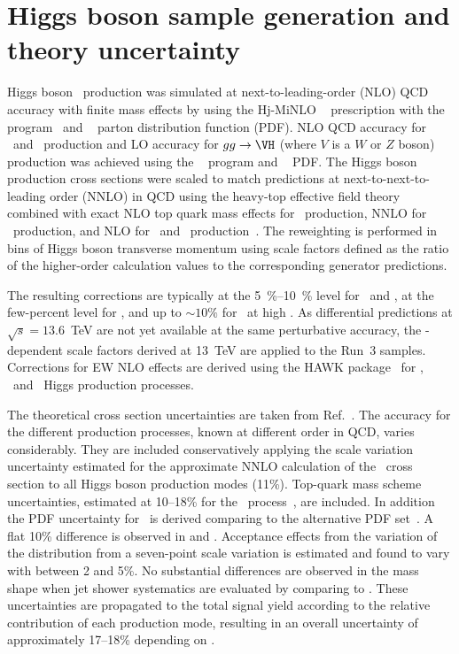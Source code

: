 \documentclass[PAPER, cernpreprint=true, atlasdraft=false, UKenglish, texmf, orcidlogo]{atlasdoc}
\begin{document}
\section{Higgs boson sample generation and theory uncertainty}
Higgs boson \ggF\ production was simulated at next-to-leading-order (NLO) QCD accuracy with finite mass effects by using the {\textsc Hj-MiNLO} ~\cite{Hamilton:2015nsa,Hamilton:2012np,Campbell:2012am,Hamilton:2012rf} prescription with the \POWHEGBOX program~\cite{Alioli:2010xd,Nason:2004rx,Frixione:2007vw} and \NNPDF[3.0nnlo]~\cite{Ball:2014uwa} parton distribution function (PDF).
NLO QCD accuracy for \VBF\ and \ttH\ production and LO accuracy for $gg\to\VH$ (where $V$ is a $W$ or $Z$ boson) production was achieved using the \POWHEGBOX~\cite{Nason:2009ai,Hartanto:2015uka,Alioli:2010xd,Nason:2004rx,Frixione:2007vw} program and \NNPDF[3.0nlo]~\cite{Ball:2014uwa} PDF.
The Higgs boson production cross sections were scaled to match predictions at next-to-next-to-leading order (NNLO) in QCD using the heavy-top effective field theory combined with exact NLO top quark mass effects for \ggF\ production, NNLO for \VBF\ production, and NLO for \VH\ and \ttH\ production~\cite{Becker:2020rjp}.
The reweighting is performed in bins of Higgs boson transverse momentum using scale factors defined as the ratio of the higher-order calculation values to the corresponding generator predictions.

The resulting corrections are typically at the \SIrange{5}{10}{\%} level for \ggF\ and \VBF, at the few-percent level for \ttH, and up to $\sim10\%$ for \VH\ at high \pT.
As differential predictions at $\sqrt{s}=13.6$~TeV are not yet available at the same perturbative accuracy, the \pT-dependent scale factors derived at 13~TeV are applied to the Run~3 samples.
Corrections for EW NLO effects are derived using the \textsc{HAWK} package~\cite{Denner:2014cla} for \VH, \VBF ~and \ttH ~Higgs production processes.

The theoretical cross section uncertainties are taken from Ref.~\cite{Becker:2020rjp}. The accuracy for the different production processes, known at different order in QCD, varies considerably. They are included conservatively applying the scale variation uncertainty estimated for the approximate NNLO calculation of the \ggF\ cross section to all Higgs boson production modes (11\%). Top-quark mass scheme uncertainties, estimated at 10--18\% for the \ggF\ process~\cite{ATL-PHYS-PUB-2023-031}, are included.  In addition the PDF uncertainty for \ggF\ is derived comparing to the alternative \PDFforLHC[15nlo] PDF set~\cite{Butterworth:2015oua}. A flat 10\% difference is observed in \pTH and \mJ. Acceptance effects from the variation of the \pTH distribution from a seven-point scale variation is estimated and found to vary with \pTH between 2 and 5\%. No substantial differences are observed in the mass shape when jet shower systematics are evaluated by comparing \Pythia to \Herwig. These uncertainties are propagated to the total signal yield according to the relative contribution of each production mode, resulting in an overall uncertainty of approximately 17--18\% depending on \pT.
\end{document}
